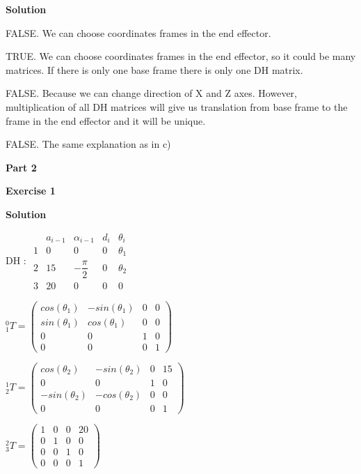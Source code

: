\documentclass[8pt]{article}
\begin{document}
\textbf{Solution}

\medskip

\begin{list}{()~}{}
\item
FALSE. We can choose coordinates frames in the end effector.
\item
TRUE. We can choose coordinates frames in the end effector, so it could be many matrices. If there is only one base frame there is only one DH matrix.
\item
FALSE. Because we can change direction of X and Z axes. However, multiplication of all DH matrices will give us translation from base frame to the frame in the end effector and it will be unique.
\item
FALSE. The same explanation as in c)
\end{list}

\textbf{Part 2}	

\bigskip

\textbf{Exercise 1}		
		
\textbf{Solution}

\medskip

DH :
$ \begin{array}{ccccc}
&a_{i-1} & \alpha_{i-1} & d_i & \theta_i \\
1&0 & 0 & 0 & \theta_1 \\
2&15 & - \dfrac{\pi}{2} & 0 & \theta_2 \\
3&20 & 0 & 0 & 0
\end{array} $

$^0_1T = \left( \begin{array}{cccc}
cos(\theta_1) & -sin(\theta_1) & 0 & 0 \\
sin(\theta_1) & cos(\theta_1) & 0 & 0 \\
0 & 0 & 1 & 0 \\
0 & 0 & 0 & 1
\end{array} \right) $

$^1_2T = \left( \begin{array}{cccc}
cos(\theta_2) & -sin(\theta_2) & 0 & 15 \\
0 & 0 & 1 & 0 \\
-sin(\theta_2) & -cos(\theta_2) & 0 & 0 \\
0 & 0 & 0 & 1
\end{array} \right) $

$^2_3T = \left( \begin{array}{cccc}
1 & 0 & 0 & 20 \\
0 & 1 & 0 & 0 \\
0& 0 & 1 & 0 \\
0 & 0 & 0 & 1
\end{array} \right) $
\end{document}
